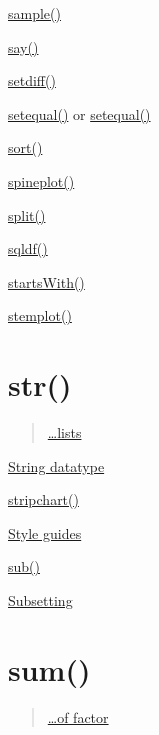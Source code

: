 \documentclass[]{book}
\begin{document}
\href{https://linkedin-learning.pxf.io/rweekly_random}{sample()}

\href{https://linkedin-learning.pxf.io/rweekly_cowsay}{say()}

\href{https://linkedin-learning.pxf.io/Rweekly_setsUnionInterDiff}{setdiff()}

\href{https://linkedin-learning.pxf.io/Rweekly_setsUnionInterDiff}{setequal()} or \href{https://linkedin-learning.pxf.io/rweekly_equalIn}{setequal()}

\href{https://linkedin-learning.pxf.io/rweekly_sortmerge}{sort()}

\href{https://linkedin-learning.pxf.io/rweekly_spineplot}{spineplot()}

\href{https://linkedin-learning.pxf.io/rweekly_split}{split()}

\href{https://linkedin-learning.pxf.io/rweekly_sqldf}{sqldf()}

\href{https://linkedin-learning.pxf.io/rweekly_simplestringmatch}{startsWith()}

\href{https://linkedin-learning.pxf.io/rweekly_stemplot}{stemplot()}

\hypertarget{str}{%
\section*{str()}\label{str}}

\begin{quote}
\href{https://linkedin-learning.pxf.io/rweekly_lists}{\ldots{}lists}
\end{quote}

\href{https://linkedin-learning.pxf.io/rweekly_atomics}{String datatype}

\href{linkedin-learning.pxf.io/rweekly_stripchart}{stripchart()}

\href{https://linkedin-learning.pxf.io/rweekly_styleguides}{Style guides}

\href{https://linkedin-learning.pxf.io/rweekly_grep}{sub()}

\href{https://linkedin-learning.pxf.io/rweekly_subset}{Subsetting}

\hypertarget{sum}{%
\section*{sum()}\label{sum}}

\begin{quote}
\href{https://linkedin-learning.pxf.io/rweekly_factor}{\ldots{}of factor}
\end{quote}
\end{document}
